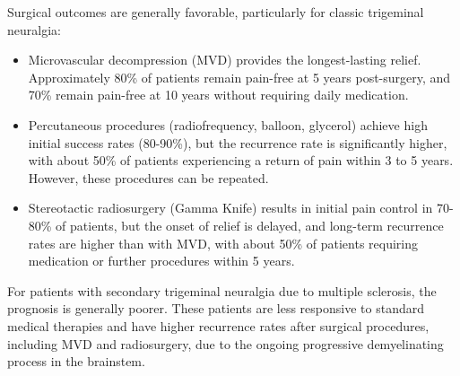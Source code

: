 Surgical outcomes are generally favorable, particularly for classic trigeminal neuralgia:
\begin{itemize}
  \item Microvascular decompression (MVD) provides the longest-lasting relief. Approximately 80\% of patients remain pain-free at 5 years post-surgery, and 70\% remain pain-free at 10 years without requiring daily medication.
  \item Percutaneous procedures (radiofrequency, balloon, glycerol) achieve high initial success rates (80-90\%), but the recurrence rate is significantly higher, with about 50\% of patients experiencing a return of pain within 3 to 5 years. However, these procedures can be repeated.
  \item Stereotactic radiosurgery (Gamma Knife) results in initial pain control in 70-80\% of patients, but the onset of relief is delayed, and long-term recurrence rates are higher than with MVD, with about 50\% of patients requiring medication or further procedures within 5 years.
\end{itemize}

For patients with secondary trigeminal neuralgia due to multiple sclerosis, the prognosis is generally poorer. These patients are less responsive to standard medical therapies and have higher recurrence rates after surgical procedures, including MVD and radiosurgery, due to the ongoing progressive demyelinating process in the brainstem.

